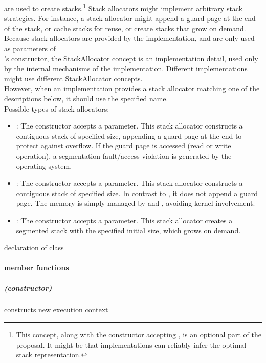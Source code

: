 \label{subsec:stackalloc}
are used to create stacks.\footnote{This concept, along with the \ectx
constructor accepting , is an optional part of the
proposal. It might be that implementations can reliably infer the optimal
stack representation.} Stack allocators might implement arbitrary stack
strategies. For instance, a stack allocator might append a guard page at the
end of the stack, or cache stacks for reuse, or create stacks that grow on
demand.\\
Because stack allocators are provided by the implementation, and are only used
as parameters of\\
\ectx's constructor, the StackAllocator concept is an implementation detail,
used only by the internal mechanisms of the \ectx implementation. Different
implementations might use different StackAllocator concepts.\\
However, when an implementation provides a stack allocator matching one of
the descriptions below, it should use the specified name.\\
Possible types of stack allocators:
\begin{itemize}
    \item {}: The constructor accepts a 
        parameter. This stack allocator constructs a contiguous stack of
        specified size, appending a guard page at the end to protect against
        overflow. If the guard page is accessed (read or write operation), a
        segmentation fault/access violation is generated by the operating
        system.
    \item {}: The constructor accepts a  parameter.
        This stack allocator constructs a contiguous stack of specified size.
        In contrast to , it does not append a guard
        page. The memory is simply managed by 
        and , avoiding kernel involvement.
    \item {}: The constructor accepts a  parameter.
        This stack allocator creates a segmented stack with the specified
        initial size, which grows on demand.
\end{itemize}

\newpage
{}
declaration of class \ectx
{}
\paragraph*{member functions}
\subparagraph*{(constructor)}
constructs new execution context\\

